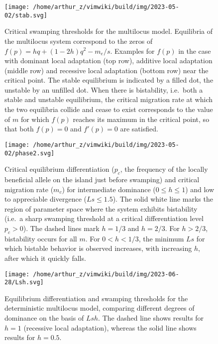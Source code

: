 \documentclass[
  11pt,
]{article}
\begin{document}
\begin{figure}
\hypertarget{fig:mlstab}{%
\centering
\texttt{[image: /home/arthur\_z/vimwiki/build/img/2023-05-02/stab.svg]}
\caption{Critical swamping thresholds for the multilocus model.
Equilibria of the multilocus system correspond to the zeros of
\(f(p) = hq + (1-2h)q^2 - m_e/s\). Examples for \(f(p)\) in the case
with dominant local adaptation (top row), additive local adaptation
(middle row) and recessive local adaptation (bottom row) near the
critical point. The stable equilibrium is indicated by a filled dot, the
unstable by an unfilled dot. When there is bistability, i.e.~both a
stable and unstable equilibrium, the critical migration rate at which
the two equilibria collide and cease to exist corresponds to the value
of \(m\) for which \(f(p)\) reaches its maximum in the critical point,
so that both \(f(p) = 0\) and \(f'(p)=0\) are
satisfied.}\label{fig:mlstab}
}
\end{figure}

\begin{figure}
\hypertarget{fig:pplot}{%
\centering
\texttt{[image: /home/arthur\_z/vimwiki/build/img/2023-05-02/phase2.svg]}
\caption{Critical equilibrium differentiation (\(p_c\), the frequency of
the locally beneficial allele on the island just before swamping) and
critical migration rate (\(m_c\)) for intermediate dominance
(\(0\le h \le 1\)) and low to appreciable divergence (\(Ls \le 1.5\)).
The solid white line marks the region of parameter space where the
system exhibits bistability (i.e.~a sharp swamping threshold at a
critical differentiation level \(p_c > 0\)). The dashed lines mark
\(h=1/3\) and \(h=2/3\). For \(h>2/3\), bistability occurs for all
\(m\). For \(0 < h < 1/3\), the minimum \(Ls\) for which bistable
behavior is observed increases, with increasing \(h\), after which it
quickly falls.}\label{fig:pplot}
}
\end{figure}

\begin{figure}
\hypertarget{fig:lsh}{%
\centering
\texttt{[image: /home/arthur\_z/vimwiki/build/img/2023-06-28/Lsh.svg]}
\caption{Equilibrium differentiation and swamping thresholds for the
deterministic multilocus model, comparing different degrees of dominance
on the basis of \(Lsh\). The dashed line shows results for \(h=1\)
(recessive local adaptation), whereas the solid line shows results for
\(h=0.5\).}\label{fig:lsh}
}
\end{figure}
\end{document}
